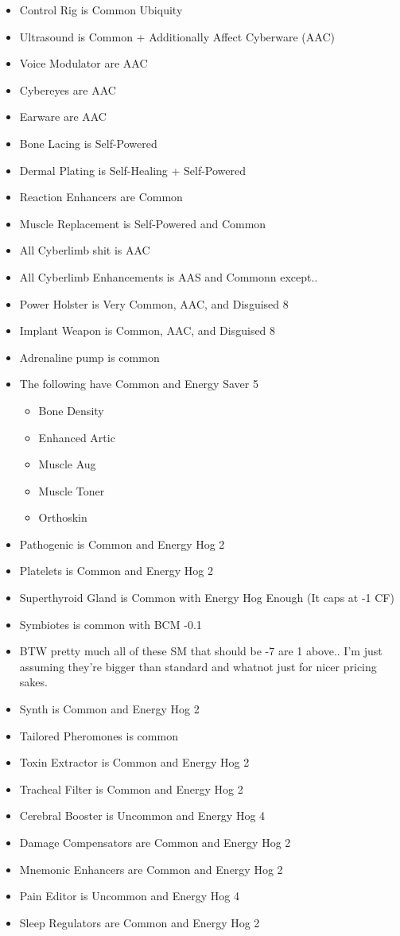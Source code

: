 	\begin{itemize}
		\itemsep 0pt
		\item Control Rig is Common Ubiquity
		\item Ultrasound is Common + Additionally Affect Cyberware (AAC)
		\item Voice Modulator are AAC
		\item Cybereyes are AAC
		\item Earware are AAC
		\item Bone Lacing is Self-Powered
		\item Dermal Plating is Self-Healing + Self-Powered
		\item Reaction Enhancers are Common
		\item Muscle Replacement is Self-Powered and Common
		\item All Cyberlimb shit is AAC
		\item All Cyberlimb Enhancements is AAS and Commonn except..
		\item Power Holster is Very Common, AAC, and Disguised 8
		\item Implant Weapon is Common, AAC, and Disguised 8
		\item Adrenaline pump is common
		\item The following have Common and Energy Saver 5
		\begin{itemize}
			\itemsep 0pt
			\item Bone Density
			\item Enhanced Artic
			\item Muscle Aug
			\item Muscle Toner
			\item Orthoskin
		\end{itemize}
	\item Pathogenic is Common and Energy Hog 2
	\item Platelets is Common and Energy Hog 2
	\item Superthyroid Gland is Common with Energy Hog Enough (It caps at -1 CF)
	\item Symbiotes is common with BCM -0.1
	\item BTW pretty much all of these SM that should be -7 are 1 above.. I'm just assuming they're bigger than standard and whatnot just for nicer pricing sakes.
	\item Synth is Common and Energy Hog 2
	\item Tailored Pheromones is common
	\item Toxin Extractor is Common and Energy Hog 2
	\item Tracheal Filter is Common and Energy Hog 2
	\item Cerebral Booster is Uncommon and Energy Hog 4
	\item Damage Compensators are Common and Energy Hog 2
	\item Mnemonic Enhancers are Common and Energy Hog 2	
	\item Pain Editor is Uncommon and Energy Hog 4
	\item Sleep Regulators are Common and Energy Hog 2
	\end{itemize}
	
